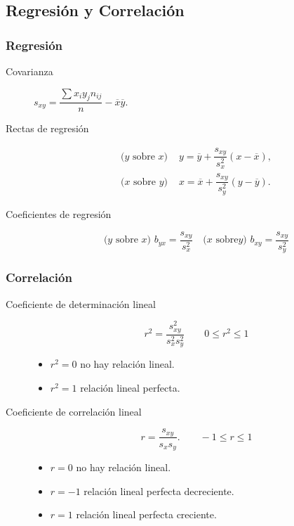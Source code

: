 \documentclass[a4paper]{article}
\newlength{\mylength}
\newenvironment{marco}{
	\setlength{\fboxsep}{5pt}
	\setlength{\mylength}{\textwidth}
	\addtolength{\mylength}{-2\fboxsep}
	\addtolength{\mylength}{-2\fboxrule}
	\noindent
	\begin{Sbox}
	\begin{minipage}{\mylength}
	\setlength{\abovedisplayskip}{3pt}
	\setlength{\belowdisplayskip}{3pt}
}
{
	\end{minipage}
	\end{Sbox}
	\fbox{\TheSbox}
}
\begin{document}
\subsection*{Regresión y Correlación}
\begin{marco}
\begin{multicols}{2}
\subsubsection*{Regresión}
\begin{description}
\item [Covarianza] $s_{xy}=\dfrac{\sum
x_iy_jn_{ij}}{n}-\overline{x}\overline{y}$.
\item [Rectas de regresión]
\begin{align*}
\textrm{($y$ sobre $x$) }&
y=\overline{y}+\dfrac{s_{xy}}{s_x^2}(x-\overline{x}),\\
\textrm{($x$ sobre $y$) }&
x=\overline{x}+\dfrac{s_{xy}}{s_y^2}(y-\overline{y}).
\end{align*}
\item [Coeficientes de regresión]
\[
\textrm{($y$ sobre $x$) } b_{yx}=\dfrac{s_{xy}}{s_x^2}\quad \textrm{($x$ sobre
$y$) } b_{xy}=\dfrac{s_{xy}}{s_y^2}
\]
\end{description}
\subsubsection*{Correlación}
\begin{description}
\item[Coeficiente de determinación lineal] 
\[r^2=\dfrac{s_{xy}^2}{s_x^2s_y^2} \qquad 0\leq r^2\leq 1\]
\begin{itemize}
\item $r^2=0$ no hay relación lineal.
\item $r^2=1$ relación lineal perfecta.
\end{itemize}

\item[Coeficiente de correlación lineal] 
\[r=\dfrac{s_{xy}}{s_xs_y}.\qquad -1\leq r\leq 1\]
\begin{itemize}
\item $r=0$ no hay relación lineal.
\item $r=-1$ relación lineal perfecta decreciente.
\item $r=1$ relación lineal perfecta creciente.
\end{itemize}
\end{description}

\end{multicols}
\end{marco}
\end{document}
